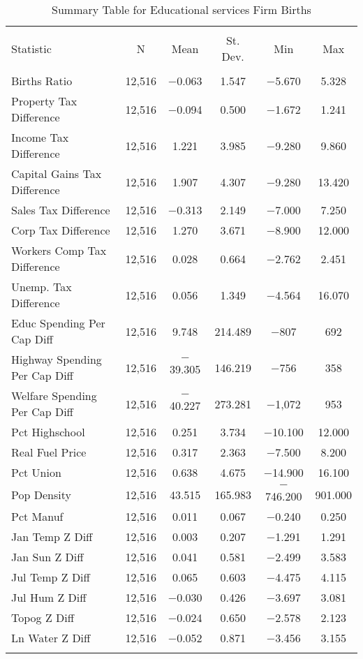 
\begin{table}[!htbp] \centering 
  \caption{Summary Table for  Educational services Firm Births} 
  \label{61summary} 
\begin{tabular}{@{\extracolsep{5pt}}lccccc} 
\\[-1.8ex]\hline 
\hline \\[-1.8ex] 
Statistic & \multicolumn{1}{c}{N} & \multicolumn{1}{c}{Mean} & \multicolumn{1}{c}{St. Dev.} & \multicolumn{1}{c}{Min} & \multicolumn{1}{c}{Max} \\ 
\hline \\[-1.8ex] 
Births Ratio & 12,516 & $-$0.063 & 1.547 & $-$5.670 & 5.328 \\ 
Property Tax Difference & 12,516 & $-$0.094 & 0.500 & $-$1.672 & 1.241 \\ 
Income Tax Difference & 12,516 & 1.221 & 3.985 & $-$9.280 & 9.860 \\ 
Capital Gains Tax Difference & 12,516 & 1.907 & 4.307 & $-$9.280 & 13.420 \\ 
Sales Tax Difference & 12,516 & $-$0.313 & 2.149 & $-$7.000 & 7.250 \\ 
Corp Tax Difference & 12,516 & 1.270 & 3.671 & $-$8.900 & 12.000 \\ 
Workers Comp Tax Difference & 12,516 & 0.028 & 0.664 & $-$2.762 & 2.451 \\ 
Unemp. Tax Difference & 12,516 & 0.056 & 1.349 & $-$4.564 & 16.070 \\ 
Educ Spending Per Cap Diff & 12,516 & 9.748 & 214.489 & $-$807 & 692 \\ 
Highway Spending Per Cap Diff & 12,516 & $-$39.305 & 146.219 & $-$756 & 358 \\ 
Welfare Spending Per Cap Diff & 12,516 & $-$40.227 & 273.281 & $-$1,072 & 953 \\ 
Pct Highschool & 12,516 & 0.251 & 3.734 & $-$10.100 & 12.000 \\ 
Real Fuel Price & 12,516 & 0.317 & 2.363 & $-$7.500 & 8.200 \\ 
Pct Union & 12,516 & 0.638 & 4.675 & $-$14.900 & 16.100 \\ 
Pop Density & 12,516 & 43.515 & 165.983 & $-$746.200 & 901.000 \\ 
Pct Manuf & 12,516 & 0.011 & 0.067 & $-$0.240 & 0.250 \\ 
Jan Temp Z Diff & 12,516 & 0.003 & 0.207 & $-$1.291 & 1.291 \\ 
Jan Sun Z Diff & 12,516 & 0.041 & 0.581 & $-$2.499 & 3.583 \\ 
Jul Temp Z Diff & 12,516 & 0.065 & 0.603 & $-$4.475 & 4.115 \\ 
Jul Hum Z Diff & 12,516 & $-$0.030 & 0.426 & $-$3.697 & 3.081 \\ 
Topog Z Diff & 12,516 & $-$0.024 & 0.650 & $-$2.578 & 2.123 \\ 
Ln Water Z Diff & 12,516 & $-$0.052 & 0.871 & $-$3.456 & 3.155 \\ 
\hline \\[-1.8ex] 
\end{tabular} 
\end{table} 
